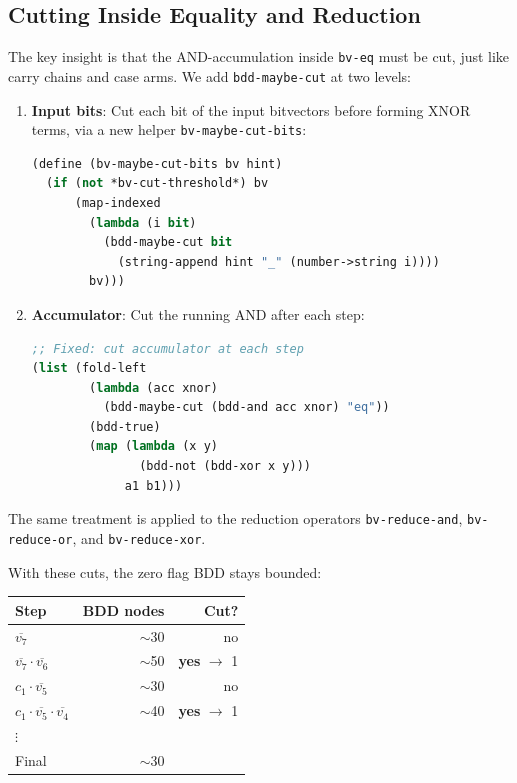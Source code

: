 \documentclass[11pt]{article}
\begin{document}
\subsection{Cutting Inside Equality and Reduction}

The key insight is that the AND-accumulation inside \texttt{bv-eq}
must be cut, just like carry chains and case arms.  We add
\texttt{bdd-maybe-cut} at two levels:

\begin{enumerate}
\item \textbf{Input bits}: Cut each bit of the input bitvectors before
  forming XNOR terms, via a new helper \texttt{bv-maybe-cut-bits}:

\begin{lstlisting}[language=Lisp]
(define (bv-maybe-cut-bits bv hint)
  (if (not *bv-cut-threshold*) bv
      (map-indexed
        (lambda (i bit)
          (bdd-maybe-cut bit
            (string-append hint "_" (number->string i))))
        bv)))
\end{lstlisting}

\item \textbf{Accumulator}: Cut the running AND after each step:

\begin{lstlisting}[language=Lisp]
;; Fixed: cut accumulator at each step
(list (fold-left
        (lambda (acc xnor)
          (bdd-maybe-cut (bdd-and acc xnor) "eq"))
        (bdd-true)
        (map (lambda (x y)
               (bdd-not (bdd-xor x y)))
             a1 b1)))
\end{lstlisting}
\end{enumerate}

The same treatment is applied to the reduction operators
\texttt{bv-reduce-and}, \texttt{bv-reduce-or}, and
\texttt{bv-reduce-xor}.

With these cuts, the zero flag BDD stays bounded:

\begin{center}
\begin{tabular}{@{}lrr@{}}
\toprule
Step & BDD nodes & Cut? \\
\midrule
$\overline{v_7}$ & $\sim$30 & no \\
$\overline{v_7} \cdot \overline{v_6}$ & $\sim$50 & \textbf{yes} $\to$ 1 \\
$c_1 \cdot \overline{v_5}$ & $\sim$30 & no \\
$c_1 \cdot \overline{v_5} \cdot \overline{v_4}$ & $\sim$40 & \textbf{yes} $\to$ 1 \\
$\vdots$ & & \\
Final & $\sim$30 & \\
\bottomrule
\end{tabular}
\end{center}
\end{document}
